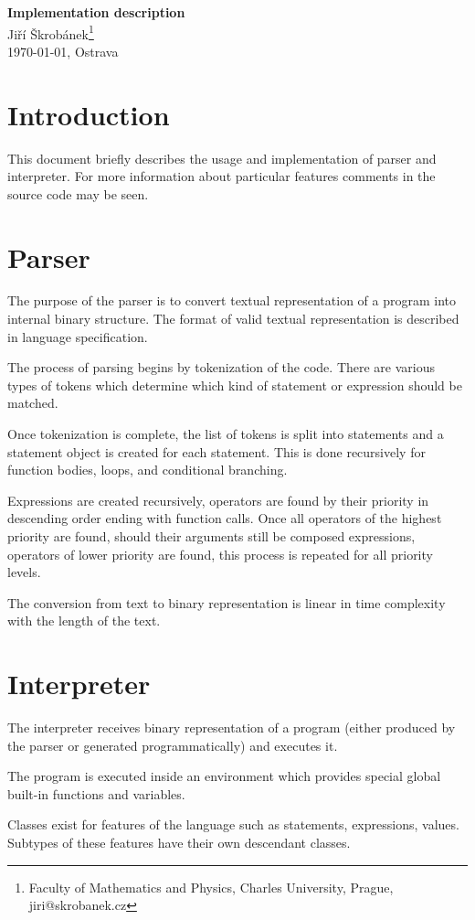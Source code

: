 \documentclass[a4paper,11pt,openany]{article}
\begin{document}
\begin{center}
{\huge \textbf{Implementation description}}\\
\vspace{10mm} {\large Jiří Škrobánek\footnote[1]{Faculty of Mathematics and Physics, Charles University, Prague, {\ttfamily jiri@skrobanek.cz}}}\\
\vspace{10mm}\today, Ostrava
\end{center}
	
\section*{Introduction}
	
This document briefly describes the usage and implementation of parser and interpreter. For more information about particular features comments in the source code may be seen.
	
\section*{Parser}

The purpose of the parser is to convert textual representation of a program into internal binary structure. The format of valid textual representation is described in language specification.

The process of parsing begins by tokenization of the code. There are various types of tokens which determine which kind of statement or expression should be matched.

Once tokenization is complete, the list of tokens is split into statements and a statement object is created for each statement. This is done recursively for function bodies, loops, and conditional branching.

Expressions are created recursively, operators are found by their priority in descending order ending with function calls. Once all operators of the highest priority are found, should their arguments still be composed expressions, operators of lower priority are found, this process is repeated for all priority levels.

The conversion from text to binary representation is linear in time complexity with the length of the text.
	
\section*{Interpreter}

The interpreter receives binary representation of a program (either produced by the parser or generated programmatically) and executes it.

The program is executed inside an environment which provides special global built-in functions and variables.

Classes exist for features of the language such as statements, expressions, values. Subtypes of these features have their own descendant classes.
\end{document}
